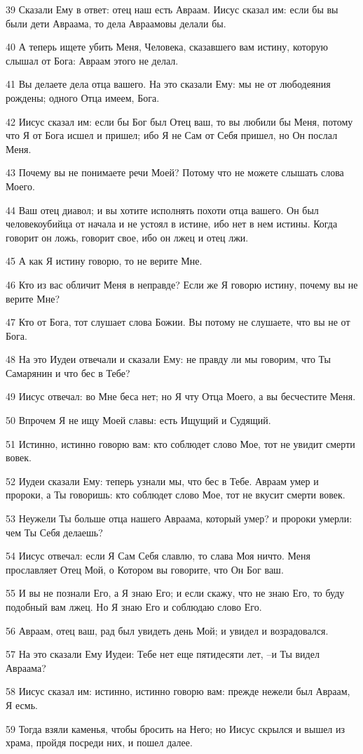 \par 39 Сказали Ему в ответ: отец наш есть Авраам. Иисус сказал им: если бы вы были дети Авраама, то дела Авраамовы делали бы.
\par 40 А теперь ищете убить Меня, Человека, сказавшего вам истину, которую слышал от Бога: Авраам этого не делал.
\par 41 Вы делаете дела отца вашего. На это сказали Ему: мы не от любодеяния рождены; одного Отца имеем, Бога.
\par 42 Иисус сказал им: если бы Бог был Отец ваш, то вы любили бы Меня, потому что Я от Бога исшел и пришел; ибо Я не Сам от Себя пришел, но Он послал Меня.
\par 43 Почему вы не понимаете речи Моей? Потому что не можете слышать слова Моего.
\par 44 Ваш отец диавол; и вы хотите исполнять похоти отца вашего. Он был человекоубийца от начала и не устоял в истине, ибо нет в нем истины. Когда говорит он ложь, говорит свое, ибо он лжец и отец лжи.
\par 45 А как Я истину говорю, то не верите Мне.
\par 46 Кто из вас обличит Меня в неправде? Если же Я говорю истину, почему вы не верите Мне?
\par 47 Кто от Бога, тот слушает слова Божии. Вы потому не слушаете, что вы не от Бога.
\par 48 На это Иудеи отвечали и сказали Ему: не правду ли мы говорим, что Ты Самарянин и что бес в Тебе?
\par 49 Иисус отвечал: во Мне беса нет; но Я чту Отца Моего, а вы бесчестите Меня.
\par 50 Впрочем Я не ищу Моей славы: есть Ищущий и Судящий.
\par 51 Истинно, истинно говорю вам: кто соблюдет слово Мое, тот не увидит смерти вовек.
\par 52 Иудеи сказали Ему: теперь узнали мы, что бес в Тебе. Авраам умер и пророки, а Ты говоришь: кто соблюдет слово Мое, тот не вкусит смерти вовек.
\par 53 Неужели Ты больше отца нашего Авраама, который умер? и пророки умерли: чем Ты Себя делаешь?
\par 54 Иисус отвечал: если Я Сам Себя славлю, то слава Моя ничто. Меня прославляет Отец Мой, о Котором вы говорите, что Он Бог ваш.
\par 55 И вы не познали Его, а Я знаю Его; и если скажу, что не знаю Его, то буду подобный вам лжец. Но Я знаю Его и соблюдаю слово Его.
\par 56 Авраам, отец ваш, рад был увидеть день Мой; и увидел и возрадовался.
\par 57 На это сказали Ему Иудеи: Тебе нет еще пятидесяти лет, --и Ты видел Авраама?
\par 58 Иисус сказал им: истинно, истинно говорю вам: прежде нежели был Авраам, Я есмь.
\par 59 Тогда взяли каменья, чтобы бросить на Него; но Иисус скрылся и вышел из храма, пройдя посреди них, и пошел далее.

